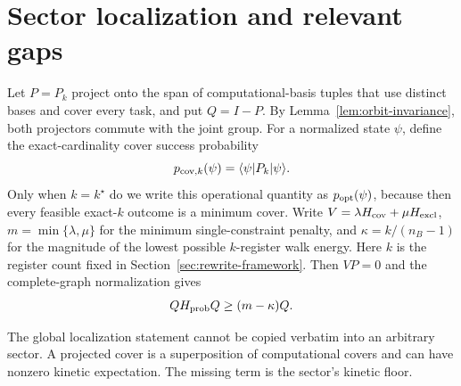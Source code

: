 \section{Sector localization and relevant gaps}
\label{sec:rewrite-localization}

Let $P=P_k$ project onto the span of computational-basis tuples that use
distinct bases and cover every task, and put $Q=I-P$.  By
Lemma~\ref{lem:orbit-invariance}, both projectors commute with the joint
group.  For a normalized state $\psi$, define the exact-cardinality cover
success probability
\begin{equation}
 p_{{\rm cov},k}(\psi)=\langle\psi|P_k|\psi\rangle.
 \label{eq:fixed-k-cover-probability}
\end{equation}
Only when $k=k^\star$ do we write this operational quantity as
$p_{\rm opt}(\psi)$, because then every feasible exact-$k$ outcome is a
minimum cover.  Write
$V=\lambda H_{\rm cov}+\mu H_{\rm excl}$,
$m=\min\{\lambda,\mu\}$ for the minimum single-constraint penalty, and
$\kappa=k/(n_B-1)$ for the magnitude of the lowest possible $k$-register
walk energy.  Here $k$ is the register count fixed in
Section~\ref{sec:rewrite-framework}.  Then $VP=0$ and the complete-graph
normalization gives
\begin{equation}
 QH_{\rm prob}Q\geq(m-\kappa)Q.
 \label{eq:q-lower-rewrite}
\end{equation}

The global localization statement cannot be copied verbatim into an
arbitrary sector.  A projected cover is a superposition of computational
covers and can have nonzero kinetic expectation.  The missing term is the
sector's kinetic floor.


